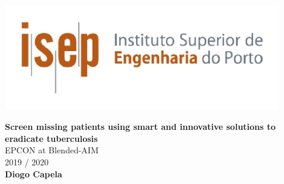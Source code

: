 
\thispagestyle{empty}

\begin{titlepage}
		\begin{center}
	
		\vspace*{2.5cm}
		\includegraphics[width=0.9\textwidth]{images/isep.jpg}

		\vspace{4.0cm}
	
		\Large{\textbf{Screen missing patients using smart and innovative solutions to eradicate tuberculosis}}\\
			
		\normalsize
		EPCON at Blended-AIM\\
		\large
		 \vspace{0.5cm}
		2019 / 2020\\
		
		\vspace{1.0cm}
		\normalsize \textbf{Diogo Capela} \\
			
		\normalsize

		\vspace*{2.8cm}
		
	\end{center}
\end{titlepage}
